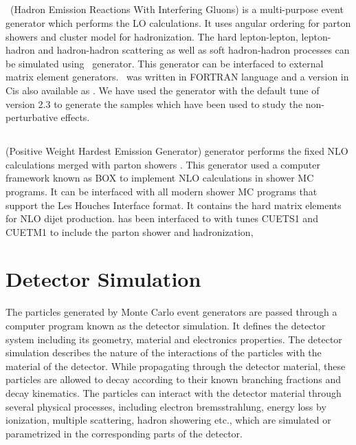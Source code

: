 \subsection{\HERWIG}
\HERWIG~(Hadron Emission Reactions With Interfering Gluons) \cite{Corcella:2000bw} is a multi-purpose event generator which performs the LO calculations. It uses angular ordering for parton showers and cluster model for hadronization. The hard lepton-lepton, lepton-hadron and hadron-hadron scattering as well as soft hadron-hadron processes can be simulated using \HERWIG~generator. This generator can be interfaced to external matrix element generators. \HERWIG~was written in FORTRAN language and a version in C\plusn\plusn is also available as \HERWIGPP \cite{Bahr:2008pv}. We have used the \HERWIGPP generator with the default tune of version 2.3 \cite{Bahr:2008tf} to generate the samples which have been used to study the non-perturbative effects. 

\subsection{\POWHEG}
\POWHEG (Positive Weight Hardest Emission Generator) generator performs the fixed NLO calculations merged with parton showers \cite{Frixione:2007vw, Nason:2004rx, Alioli:2010xa}. This generator used a computer framework known as \POWHEG BOX \cite{Oleari:2010nx} to implement NLO calculations in shower MC programs. It can be interfaced with all modern shower MC programs that support the Les Houches Interface format. It contains the hard matrix elements for NLO dijet production. \POWHEG has been interfaced to \PYTHIAE with tunes CUETS1 and CUETM1 to include the parton shower and hadronization, 
\section{Detector Simulation}
The particles generated by Monte Carlo event generators are passed through a computer program known as the detector simulation. It defines the detector system including its geometry, material and electronics properties. The detector simulation describes the nature of the interactions of the particles with the material of the detector. While propagating through the detector material, these particles are allowed to decay according to their known branching fractions and decay kinematics. The particles can interact with the detector material through several physical processes, including electron bremsstrahlung, energy loss by ionization, multiple scattering, hadron showering etc., which are simulated or parametrized in the corresponding parts of the detector. 

